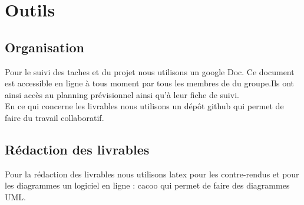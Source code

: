 \section{Outils}
\subsection{Organisation}
Pour le suivi des taches et du projet nous utilisons un google Doc. Ce document est accessible en ligne à tous moment par tous les membres de du groupe.Ils ont ainsi accès au planning prévisionnel ainsi qu'à leur fiche de suivi.\\
En ce qui concerne les livrables nous utilisons un dépôt github qui permet de faire du travail collaboratif. 
\subsection{Rédaction des livrables}
Pour la rédaction des livrables nous utilisons latex pour les contre-rendus et pour les diagrammes un logiciel en ligne : cacoo qui permet de faire des diagrammes UML. 


